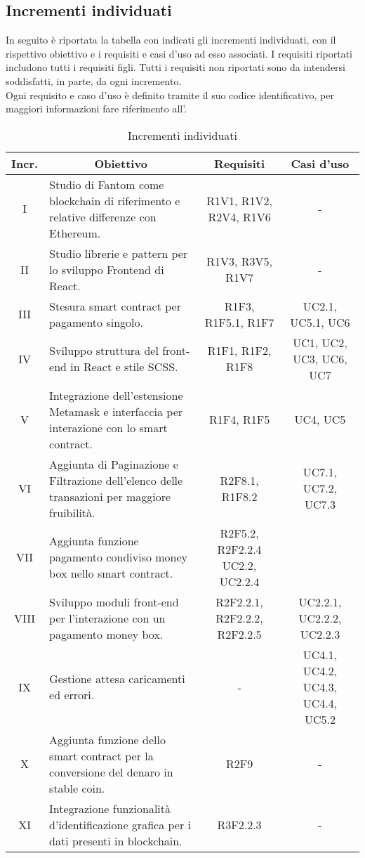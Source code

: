 
\subsection{Incrementi individuati} \label{subsection:incrementi}
In seguito è riportata la tabella con indicati gli incrementi individuati, con il rispettivo obiettivo e i requisiti e casi d'uso ad esso associati. 
I requisiti riportati includono tutti i requisiti figli. Tutti i requisiti non riportati sono da intendersi soddisfatti, in parte, da 
ogni incremento. \\
Ogni requisito e caso d'uso è definito tramite il suo codice identificativo, per maggiori informazioni fare riferimento all'\docNameVersionAdR{}.

\begin{table}[H]
  \centering
  \renewcommand{\arraystretch}{1.8}
  \begin{tabular}{c|p{8cm}|c|c}
    \rowcolor[HTML]{125E28}
    \color[HTML]{FFFFFF}\textbf{Incr.}
    & \multicolumn{1}{c}{\color[HTML]{FFFFFF}\textbf{Obiettivo}}
    & \color[HTML]{FFFFFF}\textbf{Requisiti}
    & \color[HTML]{FFFFFF}\textbf{Casi d'uso}\\
    \hline
    I	& Studio di Fantom come blockchain di riferimento e relative differenze con Ethereum.	& R1V1, R1V2, R2V4, R1V6 & - \\
    II & Studio librerie e pattern per lo sviluppo Frontend di React. & R1V3, R3V5, R1V7 & - \\
    III	& Stesura smart contract per pagamento singolo. & R1F3, R1F5.1, R1F7 & UC2.1, UC5.1, UC6 \\
    IV & Sviluppo struttura del front-end in React e stile SCSS. &	R1F1, R1F2, R1F8 & UC1, UC2, UC3, UC6, UC7 \\
    V	& Integrazione dell'estensione Metamask e interfaccia per interazione con lo smart contract. & R1F4, R1F5 & UC4, UC5 \\
    VI & Aggiunta di Paginazione e Filtrazione dell'elenco delle transazioni per maggiore fruibilità. & R2F8.1, R1F8.2 & UC7.1, UC7.2, UC7.3 \\
    VII	& Aggiunta funzione pagamento condiviso money box nello smart contract. & R2F5.2, R2F2.2.4	UC2.2, UC2.2.4 \\
    VIII & Sviluppo moduli front-end per l'interazione con un pagamento money box. & R2F2.2.1, R2F2.2.2, R2F2.2.5 & UC2.2.1, UC2.2.2, UC2.2.3 \\
    IX & Gestione attesa caricamenti ed errori. & - & UC4.1, UC4.2, UC4.3, UC4.4, UC5.2 \\
    X & Aggiunta funzione dello smart contract per la conversione del denaro in stable coin. & R2F9 & - \\
    XI & Integrazione funzionalità d'identificazione grafica per i dati presenti in blockchain. & R3F2.2.3 & - \\
  \end{tabular}
  \caption{Incrementi individuati}
\end{table}